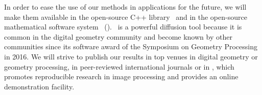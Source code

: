 In order to ease the use of our methods in applications for the future, we will make them available in the open-source C++ library \DGtal~and in the open-source mathematical software system \sage~(\wpPattern). \DGtal~is a powerful diffusion tool because it is common in the digital geometry community and become known by other communities since its software award of the Symposium on Geometry Processing in 2016. 
We will strive to publish our results in top venues in digital geometry or geometry processing, 
in peer-reviewed international journals or in \IPOL, which promotes reproducible research in image processing 
and provides an online demonstration facility. 
